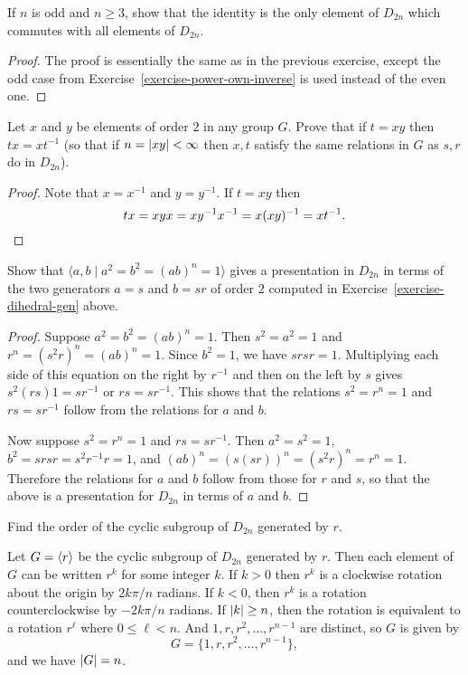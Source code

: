  If $n$ is odd and $n\geq3$, show that the identity is the
only element of $D_{2n}$ which commutes with all elements of $D_{2n}$.
\begin{proof}
  The proof is essentially the same as in the previous exercise,
  except the odd case from Exercise~\ref{exercise-power-own-inverse}
  is used instead of the even one.
\end{proof}

 Let $x$ and $y$ be elements of order $2$ in any group
$G$. Prove that if $t = xy$ then $tx = xt^{-1}$ (so that if
$n = \lvert{xy}\rvert < \infty$ then $x, t$ satisfy the same relations in $G$
as $s,r$ do in $D_{2n}$).
\begin{proof}
  Note that $x = x^{-1}$ and $y = y^{-1}$. If $t = xy$ then
  \begin{equation*}
    tx = xyx = xy^{-1}x^{-1} = x(xy)^{-1} = xt^{-1}. \qedhere
  \end{equation*}
\end{proof}

 Show that $\langle a,b\mid a^2 = b^2 = (ab)^n = 1\rangle$
gives a presentation in $D_{2n}$ in terms of the two generators
$a = s$ and $b = sr$ of order $2$ computed in
Exercise~\ref{exercise-dihedral-gen} above.
\begin{proof}
  Suppose $a^2 = b^2 = (ab)^n = 1$. Then $s^2 = a^2 = 1$ and
  $r^n = (s^2r)^n = (ab)^n = 1$. Since $b^2 = 1$, we have $srsr =
  1$. Multiplying each side of this equation on the right by $r^{-1}$
  and then on the left by $s$ gives $s^2(rs)1 = sr^{-1}$ or
  $rs = sr^{-1}$. This shows that the relations $s^2 = r^n = 1$ and
  $rs = sr^{-1}$ follow from the relations for $a$ and $b$.

  Now suppose $s^2 = r^n = 1$ and $rs = sr^{-1}$. Then
  $a^2 = s^2 = 1$, $b^2 = srsr = s^2r^{-1}r = 1$, and
  $(ab)^n = (s(sr))^n = (s^2r)^n = r^n = 1$. Therefore the relations
  for $a$ and $b$ follow from those for $r$ and $s$, so that the above
  is a presentation for $D_{2n}$ in terms of $a$ and $b$.
\end{proof}

 Find the order of the cyclic subgroup of $D_{2n}$ generated
by $r$.
\begin{solution}
  Let $G = \langle{r}\rangle$ be the cyclic subgroup of $D_{2n}$ generated by
  $r$. Then each element of $G$ can be written $r^k$ for some integer
  $k$. If $k>0$ then $r^k$ is a clockwise rotation about the origin by
  $2k\pi/n$ radians. If $k<0$, then $r^k$ is a rotation
  counterclockwise by $-2k\pi/n$ radians. If $\lvert{k}\rvert\geq n$, then the
  rotation is equivalent to a rotation $r^\ell$ where
  $0\leq\ell<n$. And $1, r, r^2, \dots, r^{n-1}$ are distinct, so $G$
  is given by
  \begin{equation*}
    G = \{ 1, r, r^2, \dots, r^{n-1} \},
  \end{equation*}
  and we have $\lvert{G}\rvert = n$.
\end{solution}
